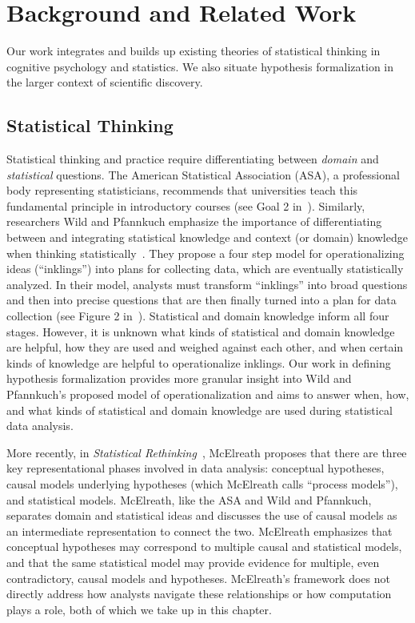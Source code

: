 \section{Background and Related Work} \label{sec:relatedWorkHypoForm}
Our work integrates and builds up existing theories of statistical thinking in
cognitive psychology and statistics. We also situate hypothesis formalization in
the larger context of scientific discovery. 

\subsection{Statistical Thinking} 
Statistical thinking and practice require differentiating between
\textit{domain} and \textit{statistical} questions. The American Statistical
Association (ASA), a professional body representing statisticians, recommends
that universities teach this fundamental principle in introductory courses (see
Goal 2 in~\cite{carver2016guidelines}). Similarly, researchers Wild and Pfannkuch emphasize the importance of
differentiating between and integrating statistical knowledge and context (or
domain) knowledge when thinking
statistically~\cite{pfannkuch1997statistical,pfannkuch2000statistical,wild1999statisticalThinking}.
They propose a four step model for operationalizing ideas (``inklings'') into
plans for collecting data, which are eventually statistically analyzed. In their
model, analysts must transform ``inklings'' into broad questions and then into
precise questions that are then finally turned into a plan for data collection
(see Figure 2 in~\cite{wild1999statisticalThinking}). Statistical and domain
knowledge inform all four stages. However, it is unknown what kinds of statistical and domain
knowledge are helpful, how they are used and weighed against each other, and
when certain kinds of knowledge are helpful to operationalize inklings. Our
work in defining hypothesis formalization provides more granular insight into Wild and Pfannkuch's
proposed model of operationalization and aims to answer when, how, and what
kinds of statistical and domain knowledge are used during statistical data
analysis. 

More recently, in \textit{Statistical
Rethinking}~\cite{mcelreath2020statistical}, McElreath proposes that
there are three key representational phases involved in data analysis:
conceptual hypotheses, causal models underlying hypotheses (which McElreath
calls ``process models''), and statistical models. McElreath, like the ASA and
Wild and Pfannkuch, separates domain and statistical ideas and discusses the use
of causal models as an intermediate representation to connect
the two. McElreath emphasizes that conceptual hypotheses may correspond to
multiple causal and statistical models, and that the same statistical
model may provide evidence for multiple, even contradictory, causal models and
hypotheses. McElreath's framework does not directly address how analysts navigate
these relationships or how computation plays a role, both of which we take up in
this chapter. 

